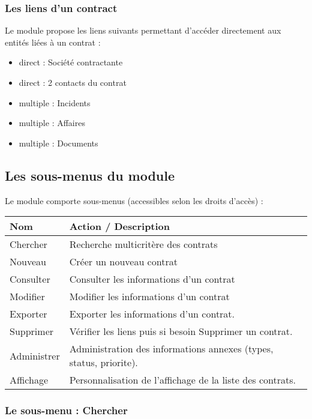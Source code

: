 \subsubsection{Les liens d'un contract}

Le module \contract propose les liens suivants permettant d'accéder directement aux entités liées à un contrat :\\

\begin{itemize}
\item direct : Société contractante
\item direct : 2 contacts du contrat
\item multiple : Incidents
\item multiple : Affaires
\item multiple : Documents
\end{itemize}


\subsection{Les sous-menus du module \contract}

Le module \contract comporte  sous-menus (accessibles selon les droits d'accès) :\\

\begin{tabular}{|p{2.5cm}|p{9.5cm}|}
\hline
\textbf{Nom} & \textbf{Action / Description} \\
\hline
Chercher & Recherche multicritère des contrats \\
\hline
Nouveau & Créer un nouveau contrat\\
\hline
Consulter & Consulter les informations d'un contrat\\
\hline
Modifier & Modifier les informations d'un contrat\\
\hline
Exporter & Exporter les informations d'un contrat.\\
\hline
Supprimer & Vérifier les liens puis si besoin Supprimer un contrat.\\
\hline
Administrer & Administration des informations annexes (types, status, priorite).\\
\hline
Affichage & Personnalisation de l'affichage de la liste des contrats.\\
\hline
\end{tabular}


\subsubsection{Le sous-menu : Chercher}

